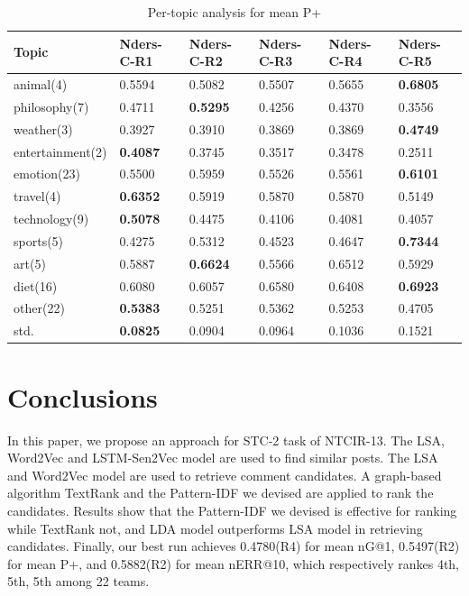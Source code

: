\documentclass{sig-alternate}
\begin{document}
\begin{table}[]
\centering
\caption{Per-topic analysis for mean P+}
\label{my-label}
\begin{tabular}{llllll}
\hline
Topic & Nders-C-R1 & Nders-C-R2 & Nders-C-R3 & Nders-C-R4 & Nders-C-R5  \\
\hline
animal(4) & 0.5594 & 0.5082 & 0.5507 & 0.5655 & \textbf{0.6805} \\
philosophy(7) & 0.4711 & \textbf{0.5295} & 0.4256 & 0.4370 & 0.3556 \\
weather(3) & 0.3927 & 0.3910 & 0.3869 & 0.3869 & \textbf{0.4749} \\
entertainment(2) & \textbf{0.4087} & 0.3745 & 0.3517 & 0.3478 & 0.2511 \\
emotion(23) & 0.5500 & 0.5959 & 0.5526 & 0.5561 & \textbf{0.6101} \\
travel(4) & \textbf{0.6352} & 0.5919 & 0.5870 & 0.5870 & 0.5149 \\
technology(9) & \textbf{0.5078} & 0.4475 & 0.4106 & 0.4081 & 0.4057 \\
sports(5) & 0.4275 & 0.5312 & 0.4523 & 0.4647 & \textbf{0.7344} \\
art(5) & 0.5887 & \textbf{0.6624} & 0.5566 & 0.6512 & 0.5929 \\
diet(16) & 0.6080 & 0.6057 & 0.6580 & 0.6408 & \textbf{0.6923} \\
other(22) & \textbf{0.5383} & 0.5251 & 0.5362 & 0.5253 & 0.4705 \\
\hline
std.  &  \textbf{0.0825}  &  0.0904  &   0.0964 &    0.1036 &    0.1521 \\
\hline
\end{tabular}
\end{table}

\section{Conclusions}
In this paper, we propose an approach for STC-2 task of NTCIR-13. The LSA,
Word2Vec and LSTM-Sen2Vec model are used to find similar posts. The LSA and Word2Vec 
model are used to retrieve comment candidates. A graph-based algorithm TextRank 
and the Pattern-IDF we devised are applied to rank the candidates. Results show 
that the Pattern-IDF we devised is effective for ranking while TextRank not, 
and LDA model outperforms LSA model in retrieving candidates. Finally, our best 
run achieves 0.4780(R4) for mean nG@1, 0.5497(R2) for mean P+, and 0.5882(R2) for 
mean nERR@10, which respectively rankes 4th, 5th, 5th among 22 teams. 
\end{document}
